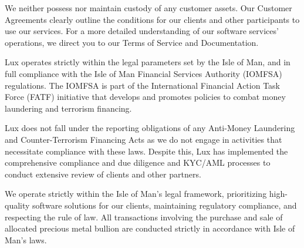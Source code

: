 \documentclass[11pt]{article}
\begin{document}
We neither possess nor maintain custody of any customer assets. Our Customer Agreements clearly outline the conditions for our clients and other participants to use our services. For a more detailed understanding of our software services' operations, we direct you to our Terms of Service and Documentation.


Lux operates strictly within the legal parameters set by the Isle of Man, and in full compliance with the Isle of Man Financial Services Authority (IOMFSA) regulations. The IOMFSA is part of the International Financial Action Task Force (FATF) initiative that develops and promotes policies to combat money laundering and terrorism financing.


Lux does not fall under the reporting obligations of any Anti-Money Laundering and Counter-Terrorism Financing Acts as we do not engage in activities that necessitate compliance with these laws. Despite this, Lux has implemented the comprehensive compliance and due diligence and KYC/AML processes to conduct extensive review of clients and other partners.


We operate strictly within the Isle of Man's legal framework, prioritizing high-quality software solutions for our clients, maintaining regulatory compliance, and respecting the rule of law. All transactions involving the purchase and sale of allocated precious metal bullion are conducted strictly in accordance with Isle of Man's laws.
\end{document}
